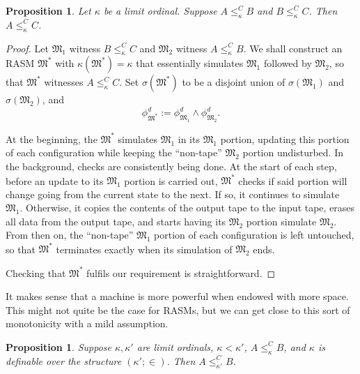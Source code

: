 \documentclass[12pt, twoside]{memoir}
\numberwithin{equation}{section}
\newtheorem{prop}[thm]{Proposition}
\theoremstyle{definition}
\theoremstyle{remark}
\theoremstyle{definition}
\theoremstyle{definition}
\theoremstyle{definition}
\theoremstyle{remark}
\begin{document}
\begin{prop}\label{prop245}
Let $\kappa$ be a limit ordinal. Suppose $A \leq^C_{\kappa} B$ and $B \leq^C_{\kappa} C$. Then $A \leq^C_{\kappa} C$.
\end{prop}

\begin{proof}
Let $\mathfrak{M}_1$ witness $B \leq^C_{\kappa} C$ and $\mathfrak{M}_2$ witness $A \leq^C_{\kappa} B$. We shall construct an RASM $\mathfrak{M}^*$ with $\kappa(\mathfrak{M}^*) = \kappa$ that essentially simulates $\mathfrak{M}_1$ followed by $\mathfrak{M}_2$, so that $\mathfrak{M}^*$ witnesses $A \leq^C_{\kappa} C$. Set $\sigma(\mathfrak{M}^*)$ to be a disjoint union of $\sigma(\mathfrak{M}_1)$ and $\sigma(\mathfrak{M}_2)$, and 
\begin{equation*}
    \phi^d_{\mathfrak{M}^*} := \phi^d_{\mathfrak{M}_1} \wedge \phi^d_{\mathfrak{M}_2} \text{.}
\end{equation*}

At the beginning, the $\mathfrak{M}^*$ simulates $\mathfrak{M}_1$ in its $\mathfrak{M}_1$ portion, updating this portion of each configuration while keeping the ``non-tape'' $\mathfrak{M}_2$ portion undisturbed. In the background, checks are consistently being done. At the start of each step, before an update to its $\mathfrak{M}_1$ portion is carried out, $\mathfrak{M}^*$ checks if said portion will change going from the current state to the next. If so, it continues to simulate $\mathfrak{M}_1$. Otherwise, it copies the contents of the output tape to the input tape, erases all data from the output tape, and starts having its $\mathfrak{M}_2$ portion simulate $\mathfrak{M}_2$. From then on, the ``non-tape'' $\mathfrak{M}_1$ portion of each configuration is left untouched, so that $\mathfrak{M}^*$ terminates exactly when its simulation of $\mathfrak{M}_2$ ends.

Checking that $\mathfrak{M}^*$ fulfils our requirement is straightforward.
\end{proof}

It makes sense that a machine is more powerful when endowed with more space. This might not quite be the case for RASMs, but we can get close to this sort of monotonicity with a mild assumption.

\begin{prop}\label{prop246}
Suppose $\kappa, \kappa'$ are limit ordinals, $\kappa < \kappa'$, $A \leq^C_{\kappa} B$, and $\kappa$ is definable over the structure $(\kappa'; \in)$. Then $A \leq^C_{\kappa'} B$.
\end{prop}
\end{document}
